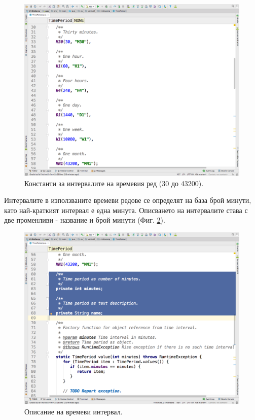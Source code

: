 \documentclass[book,14pt,oneside,openany]{memoir}
\begin{document}
\begin{figure}[h]
  \centering
  \includegraphics[height=0.45\pdfpageheight]{pic0079}
  \caption{Константи за интервалите на времевия ред (30 до 43200).}
\label{fig:pic0079}
\end{figure}
\FloatBarrier

Интервалите в използваните времеви редове се определят на база брой минути, като най-краткият интервал е една минута. Описването на интервалите става с две променливи - название и брой минути (Фиг. \ref{fig:pic0080}).

\begin{figure}[h]
  \centering
  \includegraphics[height=0.45\pdfpageheight]{pic0080}
  \caption{Описание на времеви интервал.}
\label{fig:pic0080}
\end{figure}
\FloatBarrier
\end{document}
